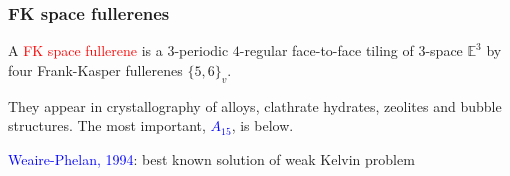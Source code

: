 \documentclass{beamer}
\begin{document}
\begin{frame}\frametitle{FK space fullerenes}
\vspace{-3mm}
A \textcolor{red}{FK space fullerene} is a $3$-periodic $4$-regular face-to-face tiling
of
$3$-space $\mathbb{E}^3$ by four Frank-Kasper fullerenes $\{5,6\}_v$.

They
appear in
crystallography of alloys,
clathrate hydrates, zeolites and bubble structures.
The most important, \textcolor{blue}{$A_{15}$}, is below.



\begin{center}
\begin{minipage}{7.5cm}
\centering 
{}\par
\end{minipage}
\end{center}
\textcolor{blue}{Weaire-Phelan, 1994}: best known
solution of 
weak Kelvin problem




\end{frame}
\end{document}
